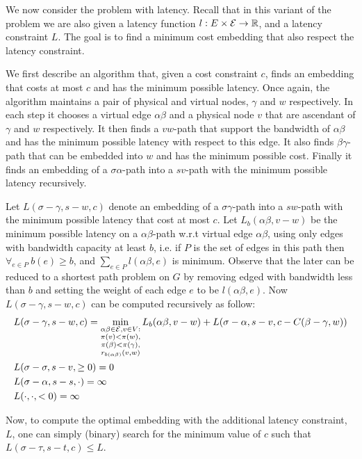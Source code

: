 We now consider the \VPN{} problem with latency.
Recall that in this variant of the problem we are also given a latency function
$l : E \times \mathcal{E} \to \mathbb{R}$, and a latency constraint $L$.
The goal is to find a minimum cost embedding that also respect the latency
constraint.

We first describe an algorithm that, given a cost constraint $c$, 
finds an embedding that costs at most $c$ and has the minimum possible latency.
Once again, the algorithm maintains a pair of physical and virtual nodes,
$\gamma$ and $w$ respectively.
In each step it chooses a virtual edge $\alpha\beta$ and a physical node $v$
that are ascendant of $\gamma$ and $w$ respectively.
It then finds a $vw$-path that support the bandwidth of $\alpha\beta$ and
has the minimum possible latency with respect to this edge.
It also finds $\beta\gamma$-path that can be embedded into $w$ and has the 
minimum possible cost.
Finally it finds an embedding of a $\sigma\alpha$-path into a $sv$-path with 
the minimum possible latency recursively.

Let $L(\sigma-\gamma, s-w, c)$ denote an embedding of a $\sigma\gamma$-path
into a $sw$-path with the minimum possible latency that cost at most $c$.
Let $L_{b}(\alpha\beta, v-w)$ be the minimum possible latency on a $\alpha\beta$-path
w.r.t virtual edge $\alpha\beta$, using only edges with bandwidth capacity at least $b$,
i.e. if $P$ is the set of edges in this path then $\forall_{e \in P}~b(e) \geq b$,
and $\sum_{e \in P}l(\alpha\beta, e)$ is minimum.
Observe that the later can be reduced to a shortest path problem on $G$ by removing
edged with bandwidth less than $b$ and setting the weight of each edge $e$ to be 
$l(\alpha\beta, e)$.
Now $L(\sigma-\gamma, s-w, c)$ can be computed recursively as follow:
\begin{align*}
&L(\sigma-\gamma, s-w, c) = 
\min_{\substack{
\alpha\beta \in \mathcal{E},  
v \in V:
\\
\pi(v) < \pi(w),
\\
\pi(\beta ) < \pi(\gamma ), 
\\
r_{b(\alpha\beta)}(v,w)
}}
L_{b}(\alpha\beta, v-w) + 
L(\sigma-\alpha, s-v, c - C(\beta-\gamma, w))
\\
&L(\sigma-\sigma, s-v, \geq 0) = 0
\\
&L(\sigma-\alpha, s-s, \cdot) = \infty
\\
&L(\cdot, \cdot, <0) = \infty
\end{align*} 

Now, to compute the optimal embedding with the additional latency constraint,
$L$, one can simply (binary) search for the minimum value of $c$ such that
$L(\sigma-\tau, s-t, c) \leq L$.
